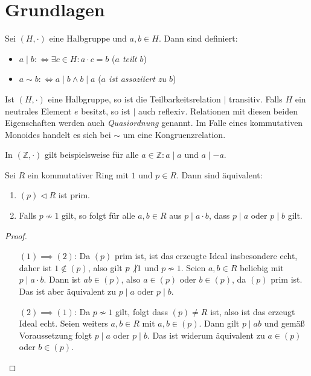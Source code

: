 \section{Grundlagen}

\begin{definition}
    Sei $(H,\cdot)$ eine Halbgruppe und $a,b\in H$. Dann sind definiert:
    \begin{itemize}
        \item $a\mid b:\Leftrightarrow \exists c\in H:a\cdot c=b$ \tab (\emph{$a$ teilt $b$})
        \item $a\sim b:\Leftrightarrow a\mid b\land b\mid a$ \tab (\emph{$a$ ist assoziiert zu $b$})
    \end{itemize}
\end{definition}

\begin{remark}
    Ist $(H,\cdot)$ eine Halbgruppe, so ist die Teilbarkeitsrelation $\mid$ transitiv.
    Falls $H$ ein neutrales Element $e$ besitzt, so ist $\mid$ auch reflexiv. Relationen mit diesen beiden Eigenschaften
    werden auch \emph{Quasiordnung} genannt. Im Falle eines kommutativen Monoides handelt es sich bei
    $\sim$ um eine Kongruenzrelation.
\end{remark}

\begin{example}
    In $(\mathbb{Z},\cdot)$ gilt beispielsweise für alle $a\in\mathbb{Z}:a\mid a$ und $a\mid -a$. 
\end{example}

\begin{proposition}
    Sei $R$ ein kommutativer Ring mit $1$ und $p\in R$. Dann sind äquivalent:
    \begin{enumerate}
        \item $(p)\triangleleft R$ ist prim.
        \item Falls $p\not\sim 1$ gilt, so folgt für alle $a,b\in R$
        aus $p\mid a\cdot b$, dass $p\mid a$ oder $p\mid b$ gilt.
    \end{enumerate}
\end{proposition}

\begin{proof}{\ }
    \begin{itemize}[leftmargin=2.5cm] 
        \item[$(1) \implies (2)$:]Da $(p)$ prim ist, ist das erzeugte Ideal insbesondere echt, daher ist $1\not\in (p)$, also gilt $p\not\vert 1$ und $p\not\sim 1$.
        Seien $a,b\in R$ beliebig mit $p\mid a\cdot b$. Dann ist $ab\in (p)$, also $a\in(p)$ oder $b\in(p)$, da $(p)$ prim ist.
        Das ist aber äquivalent zu $p\mid a$ oder $p\mid b$.
        \item[$(2) \implies (1)$:]Da $p\not\sim 1$ gilt, folgt dass $(p)\neq R$ ist, also ist das erzeugt Ideal echt.
        Seien weiters $a,b\in R$ mit $a,b\in (p)$. Dann gilt $p\mid ab$ und gemäß Voraussetzung folgt $p\mid a$ oder $p\mid b$.
        Das ist widerum äquivalent zu $a\in(p)$ oder $b\in(p)$.
    \end{itemize}
\end{proof}

